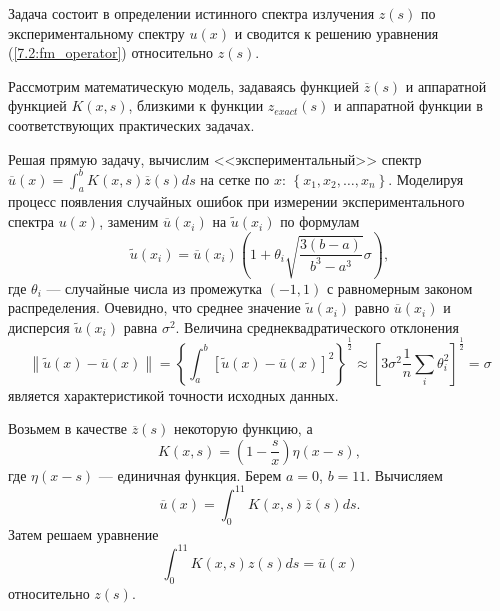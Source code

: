 \documentclass[12pt]{article}
\newcommand{\norm}[1]{\left\| #1 \right\|}
\begin{document}
	Задача состоит в определении истинного спектра излучения $z\left(s\right)$ по экспериментальному спектру $u\left(x\right)$ и сводится к решению уравнения (\ref{7.2:fm_operator}) относительно $z\left(s\right)$.
	
	Рассмотрим математическую модель, задаваясь функцией $\overline{z}\left(s\right)$ и аппаратной функцией $K\left(x,s\right)$, близкими к функции $z_{exact}\left(s\right)$ и аппаратной функции в соответствующих практических задачах.
	
	Решая прямую задачу, вычислим <<экспериментальный>> спектр $\overline{u}\left(x\right)=\int_{a}^{b}K\left(x,s\right)\overline{z}\left(s\right)ds$ на сетке по $x$: $\left\{x_1,x_2,\ldots,x_n\right\}$. Моделируя процесс появления случайных ошибок при измерении экспериментального спектра $u\left(x\right)$, заменим $\overline{u}\left(x_i\right)$ на $\tilde{u}\left(x_i\right)$ по формулам
	\begin{equation}
		\tilde{u}\left(x_i\right)=\overline{u}\left(x_i\right)\left(1+\theta_i \sqrt{\frac{3\left(b-a\right)}{b^3 - a^3}}\sigma\right),
	\end{equation}
	где $\theta_i$ --- случайные числа из промежутка $\left(-1,1\right)$ с равномерным законом распределения. Очевидно, что среднее значение $\tilde{u}\left(x_i\right)$ равно $\overline{u}\left(x_i\right)$ и дисперсия $\tilde{u}\left(x_i\right)$ равна $\sigma^2$. Величина среднеквадратического отклонения
	\begin{equation}
		\norm{\tilde{u}\left(x\right)-\overline{u}\left(x\right)}=\left\{\int_{a}^{b}\left[\tilde{u}\left(x\right)-\overline{u}\left(x\right)\right]^2\right\}^{\frac{1}{2}}\approx \left[3\sigma^2 \frac{1}{n}\sum_{i}\theta_i^2\right]^{\frac{1}{2}}=\sigma
	\end{equation}
	является характеристикой точности исходных данных.
	
	Возьмем в качестве $\overline{z}\left(s\right)$  некоторую функцию, а $$K\left(x,s\right)=\left(1-\frac{s}{x}\right)\eta\left(x-s\right),$$ где $\eta\left(x-s\right)$ --- единичная функция. Берем $a=0$, $b=11$.
	Вычисляем
	\begin{equation}
		\overline{u}\left(x\right)=\int_{0}^{11}K\left(x,s\right)\overline{z}\left(s\right)ds.
	\end{equation}
	Затем решаем уравнение
	\begin{equation}
		\int_{0}^{11}K\left(x,s\right)z\left(s\right)ds=\overline{u}\left(x\right)
	\end{equation}
	относительно $z\left(s\right)$.
	
\end{document}
